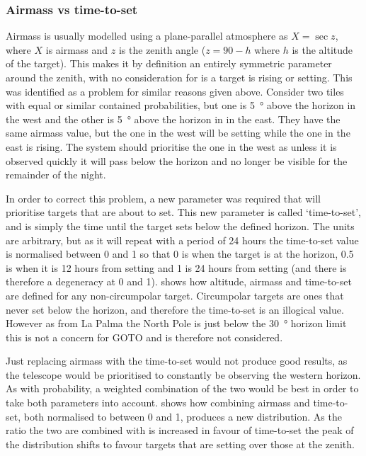 \begin{colsection}
\begin{colsection}
\subsubsection{Airmass vs time-to-set}

Airmass is usually modelled using a plane-parallel atmosphere as $X=\sec{z}$, where $X$ is airmass and $z$ is the zenith angle ($z=90-h$ where $h$ is the altitude of the target). This makes it by definition an entirely symmetric parameter around the zenith, with no consideration for is a target is rising or setting. This was identified as a problem for similar reasons given above. Consider two tiles with equal or similar contained probabilities, but one is \SI{5}{\degree} above the horizon in the west and the other is \SI{5}{\degree} above the horizon in in the east. They have the same airmass value, but the one in the west will be setting while the one in the east is rising. The system should prioritise the one in the west as unless it is observed quickly it will pass below the horizon and no longer be visible for the remainder of the night.

In order to correct this problem, a new parameter was required that will prioritise targets that are about to set. This new parameter is called `time-to-set', and is simply the time until the target sets below the defined horizon. The units are arbitrary, but as it will repeat with a period of 24 hours the time-to-set value is normalised between 0 and 1 so that 0 is when the target is at the horizon, 0.5 is when it is 12 hours from setting and 1 is 24 hours from setting (and there is therefore a degeneracy at 0 and 1).  shows how altitude, airmass and time-to-set are defined for any non-circumpolar target. Circumpolar targets are ones that never set below the horizon, and therefore the time-to-set is an illogical value. However as from La Palma the North Pole is just below the \SI{30}{\degree} horizon limit this is not a concern for GOTO and is therefore not considered.

Just replacing airmass with the time-to-set would not produce good results, as the telescope would be prioritised to constantly be observing the western horizon. As with probability, a weighted combination of the two would be best in order to take both parameters into account.  shows how combining airmass and time-to-set, both normalised to between 0 and 1, produces a new distribution. As the ratio the two are combined with is increased in favour of time-to-set the peak of the distribution shifts to favour targets that are setting over those at the zenith.


\end{colsection}
\end{colsection}
